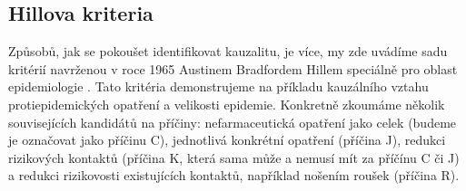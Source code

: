 
\subsection*{Hillova kriteria}

Způsobů, jak se pokoušet identifikovat kauzalitu, je více,
my zde uvádíme sadu kritérií navrženou v roce 1965 Austinem Bradfordem Hillem
speciálně pro oblast epidemiologie \cite{hill1965environment}. Tato kritéria demonstrujeme na příkladu kauzálního vztahu protiepidemických opatření a velikosti epidemie. Konkretně zkoumáme několik souvisejících kandidátů na příčiny: nefarmaceutická opatření jako celek (budeme je označovat jako příčinu C),
jednotlivá konkrétní opatření (příčina J), redukci rizikových
kontaktů (příčina K, která sama může a nemusí mít za příčínu C či
J) a redukci rizikovosti existujících kontaktů, například nošením roušek (příčina
R). 

